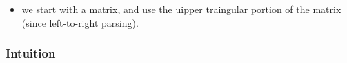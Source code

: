 \documentclass[11pt]{article}
\begin{document}
\begin{minipage}[l]{.5\linewidth}
    \begin{figure}[H]
        \centering
    \end{figure}    
\end{minipage}\hfill
\begin{minipage}[r]{.48\linewidth}
    \begin{itemize}
        \item we start with a matrix, and use the uipper traingular portion of the matrix (since left-to-right parsing).
    \end{itemize}
\end{minipage}

\subsubsection{Intuition}
\end{document}
